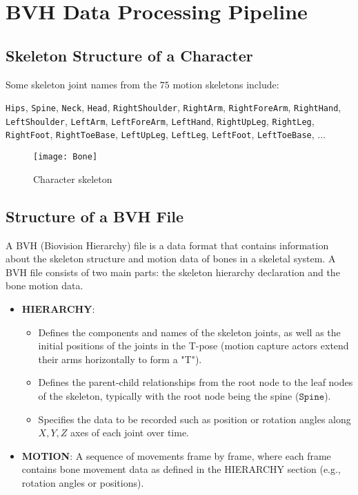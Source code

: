 \chapter{BVH Data Processing Pipeline}
\label{appendix:BVHData}

\section{Skeleton Structure of a Character}
\label{appendix:BVHData:skeleton}

Some skeleton joint names from the $75$ motion skeletons include:

{
\small
\texttt{Hips},
\texttt{Spine},
\texttt{Neck},
\texttt{Head},
\texttt{RightShoulder},
\texttt{RightArm},
\texttt{RightForeArm},
\texttt{RightHand},
\texttt{LeftShoulder},
\texttt{LeftArm},
\texttt{LeftForeArm},
\texttt{LeftHand},
\texttt{RightUpLeg},
\texttt{RightLeg},
\texttt{RightFoot},
\texttt{RightToeBase},
\texttt{LeftUpLeg},
\texttt{LeftLeg},
\texttt{LeftFoot},
\texttt{LeftToeBase},
...
}

\begin{figure}[H]
\centering
\texttt{[image: Bone]}
\caption{Character skeleton}
\label{fig:Bone}
\end{figure}

\section{Structure of a BVH File}
\label{appendix:BVHData:BVHStructure}

A BVH (Biovision Hierarchy) file is a data format that contains information about the skeleton structure and motion data of bones in a skeletal system. A BVH file consists of two main parts: the skeleton hierarchy declaration and the bone motion data.

\begin{itemize}
	\item \textbf{HIERARCHY}:
	
	\begin{itemize}
		\item Defines the components and names of the skeleton joints, as well as the initial positions of the joints in the T-pose (motion capture actors extend their arms horizontally to form a "T").
		\item Defines the parent-child relationships from the root node to the leaf nodes of the skeleton, typically with the root node being the spine ($\texttt{Spine}$).
		\item Specifies the data to be recorded such as position or rotation angles along $X, Y, Z$ axes of each joint over time.
	\end{itemize}
	
	\item \textbf{MOTION}: A sequence of movements frame by frame, where each frame contains bone movement data as defined in the HIERARCHY section (e.g., rotation angles or positions).
\end{itemize}

